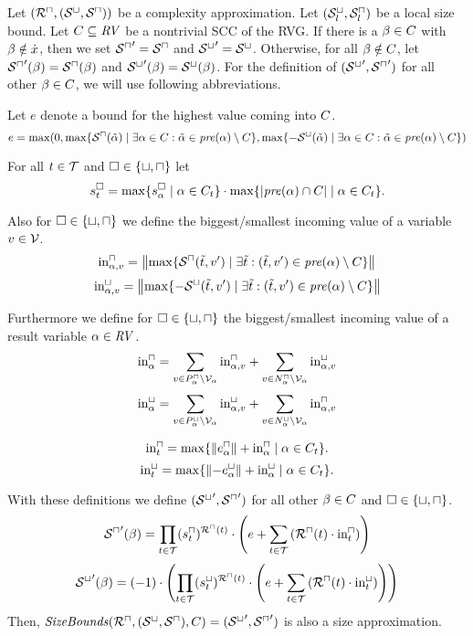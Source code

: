 \begin{theorem}
  Let $({\mathcal{R}^\sqcap}, {({\mathcal{S}^\sqcup}, {\mathcal{S}^\sqcap})})$ be a complexity approximation.
  Let ${({\mathcal{S}^\sqcup_l}, {\mathcal{S}^\sqcap_l})}$ be a local size bound.
  Let $C \subseteq \mathit{RV}$ be a nontrivial SCC of the RVG.
  If there is a $\beta \in C$ with $\beta \notin \dot{x}$, then we set ${\mathcal{S}^\sqcap}' = {\mathcal{S}^\sqcap}$ and ${\mathcal{S}^\sqcup}' = {\mathcal{S}^\sqcup}$.
  Otherwise, for all $\beta \notin C$, let ${\mathcal{S}^\sqcap}'(\beta) = {\mathcal{S}^\sqcap}(\beta)$ and ${\mathcal{S}^\sqcup}'(\beta) = {\mathcal{S}^\sqcup}(\beta)$.
  For the definition of $({\mathcal{S}^\sqcup}', {\mathcal{S}^\sqcap}')$ for all other $\beta \in C$, we will use following abbreviations.

  Let $e$ denote a bound for the highest value coming into $C$.
  \[ e = \max ( 0,
    \max \lbrace {\mathcal{S}^\sqcap}(\tilde{\alpha}) \mid \exists \alpha \in C: \tilde{\alpha} \in \mathit{pre}(\alpha) \setminus C \rbrace,
    \max \lbrace -{\mathcal{S}^\sqcup}(\tilde{\alpha}) \mid \exists \alpha \in C: \tilde{\alpha} \in \mathit{pre}(\alpha) \setminus C \rbrace)
  \]

  For all $t \in \mathcal{T}$ and $\square \in \lbrace \sqcup, \sqcap \rbrace$ let
  \[ s^\square_t = \max \lbrace s^\square_{\alpha} \mid \alpha \in C_t \rbrace \cdot \max \lbrace \left|\mathit{pre}(\alpha) \cap C\right| \mid \alpha \in C_t \rbrace. \]

  Also for $\square \in \lbrace \sqcup, \sqcap \rbrace$ we define the biggest/smallest incoming value of a variable $v \in \mathcal{V}$.
  \[ \text{in}^\sqcap_{\alpha,v} = \left\Vert\max \lbrace \mathcal{S}^\sqcap(\tilde{t}, v') \mid \exists \tilde{t}: (\tilde{t}, v') \in \mathit{pre}(\alpha) \setminus C \rbrace\right\Vert \]
  \[ \text{in}^\sqcup_{\alpha,v} = \left\Vert\max \lbrace -\mathcal{S}^\sqcup(\tilde{t}, v') \mid \exists \tilde{t}: (\tilde{t}, v') \in \mathit{pre}(\alpha) \setminus C \rbrace\right\Vert \]

  Furthermore we define for $\square \in \lbrace \sqcup, \sqcap \rbrace$ the biggest/smallest incoming value of a result variable $\alpha \in \mathit{RV}$.
  \[ \text{in}^\sqcap_\alpha = \sum_{v \in P_\alpha^\sqcap \setminus \mathcal{V}_\alpha} \text{in}^\sqcap_{\alpha,v} + \sum_{v \in N_\alpha^\sqcap \setminus \mathcal{V}_\alpha} \text{in}^\sqcup_{\alpha,v} \]
  \[ \text{in}^\sqcup_\alpha = \sum_{v \in P_\alpha^\sqcup \setminus \mathcal{V}_\alpha} \text{in}^\sqcup_{\alpha,v} + \sum_{v \in N_\alpha^\sqcup \setminus \mathcal{V}_\alpha} \text{in}^\sqcap_{\alpha,v} \]
  
  \[ \text{in}^\sqcap_t = \max \lbrace \left\Vert e^{\sqcap}_\alpha\right\Vert + \text{in}^\sqcap_\alpha \mid \alpha \in C_t  \rbrace. \]
  \[ \text{in}^\sqcup_t = \max \lbrace \left\Vert-e^{\sqcup}_\alpha\right\Vert + \text{in}^\sqcup_\alpha \mid \alpha \in C_t  \rbrace. \]

  With these definitions we define $({\mathcal{S}^\sqcup}', {\mathcal{S}^\sqcap}')$ for all other $\beta \in C$ and $\square \in \lbrace \sqcup, \sqcap \rbrace$.
  \[ {\mathcal{S}^\sqcap}'(\beta) =
  \prod_{t \in \mathcal{T}} (s^\sqcap_t)^{{\mathcal{R}^\sqcap}(t)} \cdot \left( e + 
  \sum_{t \in \mathcal{T}} \left( {\mathcal{R}^\sqcap}(t) \cdot \text{in}^\sqcap_t \right) \right)
  \]
  \[ {\mathcal{S}^\sqcup}'(\beta) = (-1) \cdot \left(
  \prod_{t \in \mathcal{T}} (s^\sqcup_t)^{{\mathcal{R}^\sqcap}(t)} \cdot \left( e + 
  \sum_{t \in \mathcal{T}} \left( {\mathcal{R}^\sqcap}(t) \cdot \text{in}^\sqcup_t \right) \right)
  \right)
  \]
  Then, $\mathit{SizeBounds}({\mathcal{R}^\sqcap}, {({\mathcal{S}^\sqcup}, {\mathcal{S}^\sqcap})}, C) = ({\mathcal{S}^\sqcup}', {\mathcal{S}^\sqcap}')$ is also a size approximation. 
\end{theorem}

